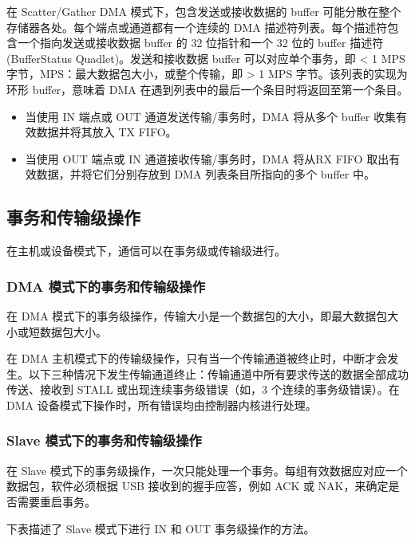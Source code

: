 \documentclass[main\_\_CN.tex]{subfiles}
\begin{document}
在 Scatter/Gather DMA 模式下，包含发送或接收数据的 buffer 可能分散在整个存储器各处。每个端点或通道都有一个连续的 DMA 描述符列表。每个描述符包含一个指向发送或接收数据 buffer 的 32 位指针和一个 32 位的 buffer 描述符 (BufferStatus Quadlet)。发送和接收数据 buffer 可以对应单个事务，即 < 1 MPS 字节，MPS：最大数据包大小，或整个传输，即 > 1 MPS 字节。该列表的实现为环形 buffer，意味着 DMA 在遇到列表中的最后一个条目时将返回至第一个条目。

\begin{itemize}
    \item 当使用 IN 端点或 OUT 通道发送传输/事务时，DMA 将从多个 buffer 收集有效数据并将其放入 TX FIFO。
    \item 当使用 OUT 端点或 IN 通道接收传输/事务时，DMA 将从RX FIFO 取出有效数据，并将它们分别存放到 DMA 列表条目所指向的多个 buffer 中。
\end{itemize}

\subsection{事务和传输级操作}

在主机或设备模式下，通信可以在事务级或传输级进行。

\subsubsection{DMA 模式下的事务和传输级操作}

在 DMA 模式下的事务级操作，传输大小是一个数据包的大小，即最大数据包大小或短数据包大小。

在 DMA 主机模式下的传输级操作，只有当一个传输通道被终止时，中断才会发生。以下三种情况下发生传输通道终止：传输通道中所有要求传送的数据全部成功传送、接收到 STALL 或出现连续事务级错误（如，3 个连续的事务级错误）。在 DMA 设备模式下操作时，所有错误均由控制器内核进行处理。

\subsubsection{ Slave 模式下的事务和传输级操作}

在 Slave 模式下的事务级操作，一次只能处理一个事务。每组有效数据应对应一个数据包，软件必须根据 USB 接收到的握手应答，例如 ACK 或 NAK，来确定是否需要重启事务。

下表描述了 Slave 模式下进行 IN 和 OUT 事务级操作的方法。


\end{document}

